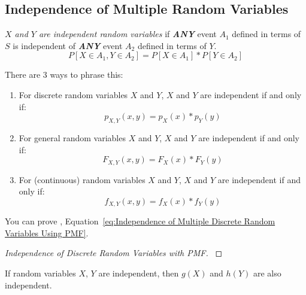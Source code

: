 	\subsection{Independence of Multiple Random Variables} \label{subsec:Independence of Multiple Random Variables}
		\begin{definition} \label{def:Independence of Multiple Random Variables}
			\emph{$X$ and $Y$ are independent random variables} if \emph{\textbf{ANY}} event $A_{1}$ defined in terms of $S$ is independent of \emph{\textbf{ANY}} event $A_{2}$ defined in terms of $Y$.
			\begin{equation} \label{eq:Independence of Multiple Random Variables}
				P \left[ X \in A_{1}, Y \in A_{2} \right] = P \left[ X \in A_{1} \right] * P \left[ Y \in A_{2} \right]
			\end{equation}
		\end{definition}
	There are 3 ways to phrase this:
	\begin{enumerate}
		\item For discrete random variables $X$ and $Y$, $X$ and $Y$ are independent if and only if:
			\begin{equation} \label{eq:Independence of Multiple Discrete Random Variables Using PMF}
				p_{X,Y} \left( x,y \right) = p_{X} \left( x \right) * p_{Y} \left( y \right)
			\end{equation}
		\item For general random variables $X$ and $Y$, $X$ and $Y$ are independent if and only if:
			\begin{equation} \label{eq:Independence of Multiple General Random Variables Using CDF}
				F_{X,Y} \left( x,y \right) = F_{X} \left( x \right) * F_{Y} \left( y \right)
			\end{equation}
		\item For (continuous) random variables $X$ and $Y$, $X$ and $Y$ are independent if and only if:
			\begin{equation} \label{eq:Independence of Multiple Continuous Random Variables Using PDF}
				f_{X,Y} \left( x,y \right) = f_{X} \left( x \right) * f_{Y} \left( y \right)
			\end{equation}
	\end{enumerate}
	You can prove , Equation~\eqref{eq:Independence of Multiple Discrete Random Variables Using PMF}.
	\begin{proof}[Independence of Discrete Random Variables with PMF] \label{proof:Independence of Discrete Random Variables with PMF}
		
	\end{proof}
	\begin{theorem} \label{thm:Independence of Random Functions}
		If random variables $X$, $Y$ are independent, then $g\left( X \right)$ and $h \left( Y \right)$ are also independent.
	\end{theorem}

